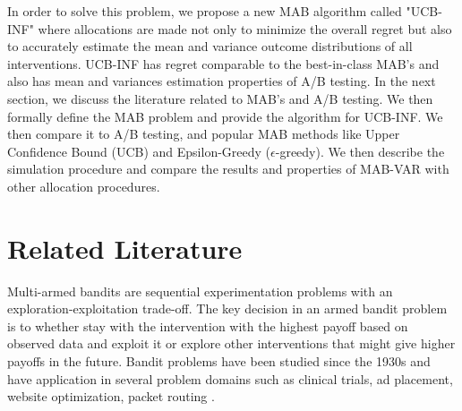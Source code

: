 \documentclass[12pt, letterpaper]{article}
\begin{document}
In order to solve this problem, we propose a new MAB algorithm called "UCB-INF" where allocations are made not only to minimize the overall regret but also to accurately estimate the mean and variance outcome distributions of all interventions. UCB-INF has regret comparable to the best-in-class MAB's and also has mean and variances estimation properties of A/B testing. In the next section, we discuss the literature related to MAB's and A/B testing. We then formally define the MAB problem and provide the algorithm for UCB-INF. We then compare it to A/B testing, and popular MAB methods like Upper Confidence Bound (UCB) and Epsilon-Greedy ($\epsilon$-greedy). We then describe the simulation procedure and compare the results and properties of MAB-VAR with other allocation procedures.



\section*{Related Literature}

Multi-armed bandits are sequential experimentation problems with an exploration-exploitation trade-off. The key decision in an armed bandit problem is to whether stay with the intervention with the highest payoff based on observed data and exploit it or explore other interventions that might give higher payoffs in the future. Bandit problems have been studied since the 1930s and have application in several problem domains such as clinical trials, ad placement, website optimization, packet routing \citep{bubeck2012regret}. 
\end{document}
